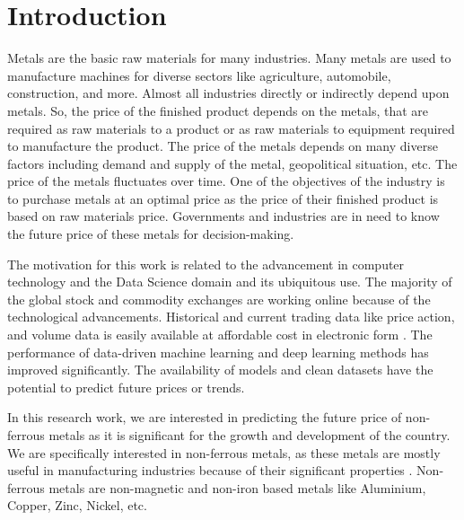 \documentclass[preprint,12pt]{elsarticle}
\begin{document}


\section{Introduction}
Metals are the basic raw materials for many industries. Many metals are used to manufacture machines for diverse sectors like agriculture, automobile, construction, and more. Almost all industries directly or indirectly depend upon metals. So, the price of the finished product depends on the metals, that are required as raw materials to a product or as raw materials to equipment required to manufacture the product. The price of the metals depends on many diverse factors including demand and supply of the metal, geopolitical situation, etc. The price of the metals fluctuates over time. One of the objectives of the industry is to purchase metals at an optimal price as the price of their finished product is based on raw materials price. Governments and industries are in need to know the future price of these metals for decision-making.
\par The motivation for this work is related to the advancement in computer technology and the Data Science domain and its ubiquitous use. The majority of the global stock and commodity exchanges are working online because of the technological advancements. Historical and current trading data like price action, and volume data is easily available at affordable cost in electronic form \cite{chakole2023tutorial}. The performance of data-driven machine learning and deep learning methods\cite{chakole2021convolutional} has improved significantly. The availability of models and clean datasets have the potential to predict future prices or trends.
\par In this research work, we are interested in predicting the future price of non-ferrous metals as it is significant for the growth and development of the country. We are specifically interested in non-ferrous metals, as these metals are mostly useful in manufacturing industries because of their significant properties \cite{watkins2004econometric}. Non-ferrous metals are non-magnetic and non-iron based metals like Aluminium, Copper, Zinc, Nickel, etc.
\end{document}
